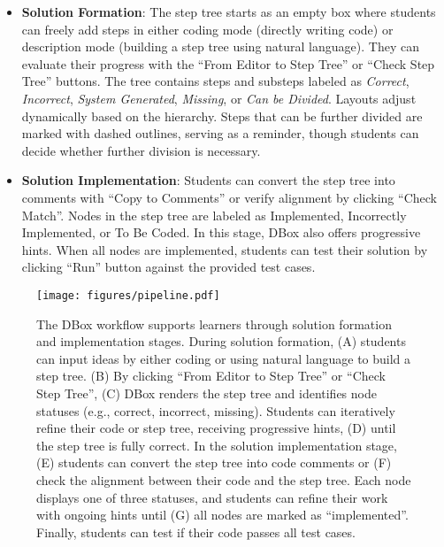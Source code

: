 \begin{itemize}
    \item \textbf{Solution Formation}: 
    The step tree starts as an empty box where students can freely add steps in either coding mode (directly writing code) or description mode (building a step tree using natural language). 
They can evaluate their progress with the ``From Editor to Step Tree'' or ``Check Step Tree'' buttons. The tree contains steps and substeps labeled as \emph{Correct}, \emph{Incorrect}, \emph{System Generated}, \emph{Missing}, or \emph{Can be Divided}. 
Layouts adjust dynamically based on the hierarchy. 
Steps that can be further divided are marked with dashed outlines, serving as a reminder, though students can decide whether further division is necessary. 
    \item \textbf{Solution Implementation}: Students can convert the step tree into comments with “Copy to Comments” or verify alignment by clicking “Check Match”. Nodes in the step tree are labeled as Implemented, Incorrectly Implemented, or To Be Coded. In this stage, DBox also offers progressive hints. When all nodes are implemented, students can test their solution by clicking “Run” button against the provided test cases.
\end{itemize}






\begin{figure*}[htbp]
	\centering 
	\texttt{[image: figures/pipeline.pdf]}
	\caption{The DBox workflow supports learners through solution formation and implementation stages. During solution formation, (A) students can input ideas by either coding or using natural language to build a step tree. (B) By clicking ``From Editor to Step Tree'' or ``Check Step Tree'', (C) DBox renders the step tree and identifies node statuses (e.g., correct, incorrect, missing). Students can iteratively refine their code or step tree, receiving progressive hints, (D) until the step tree is fully correct. In the solution implementation stage, (E) students can convert the step tree into code comments or (F) check the alignment between their code and the step tree. Each node displays one of three statuses, and students can refine their work with ongoing hints until (G) all nodes are marked as ``implemented''.
 Finally, students can test if their code passes all test cases.}
	\label{fig:workflow}
        \Description{}
\end{figure*}



